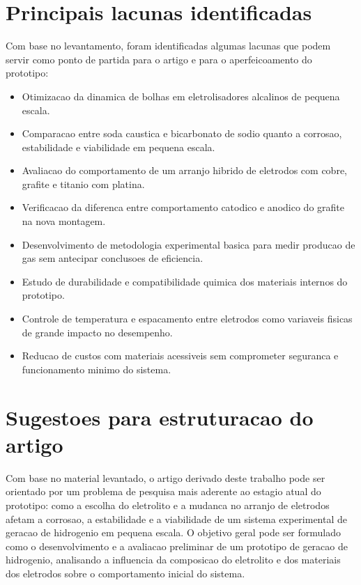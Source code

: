 \documentclass[12pt,oneside,a4paper,english,brazilian]{abntex2}
\begin{document}
\section{Principais lacunas identificadas}

Com base no levantamento, foram identificadas algumas lacunas que podem servir como ponto de partida para o artigo e para o aperfeicoamento do prototipo:

\begin{itemize}
  \item Otimizacao da dinamica de bolhas em eletrolisadores alcalinos de pequena escala.
  \item Comparacao entre soda caustica e bicarbonato de sodio quanto a corrosao, estabilidade e viabilidade em pequena escala.
  \item Avaliacao do comportamento de um arranjo hibrido de eletrodos com cobre, grafite e titanio com platina.
  \item Verificacao da diferenca entre comportamento catodico e anodico do grafite na nova montagem.
  \item Desenvolvimento de metodologia experimental basica para medir producao de gas sem antecipar conclusoes de eficiencia.
  \item Estudo de durabilidade e compatibilidade quimica dos materiais internos do prototipo.
  \item Controle de temperatura e espacamento entre eletrodos como variaveis fisicas de grande impacto no desempenho.
  \item Reducao de custos com materiais acessiveis sem comprometer seguranca e funcionamento minimo do sistema.
\end{itemize}

\section{Sugestoes para estruturacao do artigo}

Com base no material levantado, o artigo derivado deste trabalho pode ser orientado por um problema de pesquisa mais aderente ao estagio atual do prototipo: como a escolha do eletrolito e a mudanca no arranjo de eletrodos afetam a corrosao, a estabilidade e a viabilidade de um sistema experimental de geracao de hidrogenio em pequena escala. O objetivo geral pode ser formulado como o desenvolvimento e a avaliacao preliminar de um prototipo de geracao de hidrogenio, analisando a influencia da composicao do eletrolito e dos materiais dos eletrodos sobre o comportamento inicial do sistema.
\end{document}
